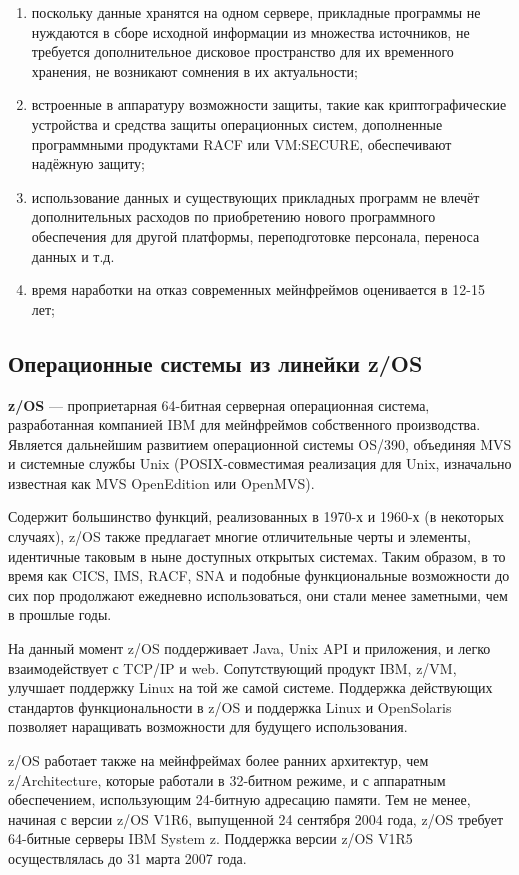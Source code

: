\documentclass[russian,utf8,emptystyle]{eskdtext}
\begin{document}
\begin{enumerate}[label=-]
\item поскольку данные хранятся на одном сервере, прикладные программы не нуждаются в сборе исходной информации из множества источников, не требуется дополнительное дисковое пространство для их временного хранения, не возникают сомнения в их актуальности;
\item встроенные в аппаратуру возможности защиты, такие как криптографические устройства и средства защиты операционных систем, дополненные программными продуктами RACF или VM:SECURE, обеспечивают надёжную защиту;
\item использование данных и существующих прикладных программ не влечёт дополнительных расходов по приобретению нового программного обеспечения для другой платформы, переподготовке персонала, переноса данных и т.д.
\item время наработки на отказ современных мейнфреймов оценивается в 12-15 лет;
\end{enumerate}

\subsection{Операционные системы из линейки z/OS}
\textbf{z/OS} — проприетарная 64-битная серверная операционная система, разработанная компанией IBM для мейнфреймов собственного производства. Является дальнейшим развитием операционной системы OS/390, объединяя MVS и системные службы Unix (POSIX-совместимая реализация для Unix, изначально известная как MVS OpenEdition или OpenMVS).

Содержит большинство функций, реализованных в 1970-х и 1960-х (в некоторых случаях), z/OS также предлагает многие отличительные черты и элементы, идентичные таковым в ныне доступных открытых системах. Таким образом, в то время как CICS, IMS, RACF, SNA и подобные функциональные возможности до сих пор продолжают ежедневно использоваться, они стали менее заметными, чем в прошлые годы.

На данный момент z/OS поддерживает Java, Unix API и приложения, и легко взаимодействует с TCP/IP и web. Сопутствующий продукт IBM, z/VM, улучшает поддержку Linux на той же самой системе. Поддержка действующих стандартов функциональности в z/OS и поддержка Linux и OpenSolaris позволяет наращивать возможности для будущего использования.

z/OS работает также на мейнфреймах более ранних архитектур, чем z/Architecture, которые работали в 32-битном режиме, и с аппаратным обеспечением, использующим 24-битную адресацию памяти. Тем не менее, начиная с версии z/OS V1R6, выпущенной 24 сентября 2004 года, z/OS требует 64-битные серверы IBM System z. Поддержка версии z/OS V1R5 осуществлялась до 31 марта 2007 года.
\end{document}
